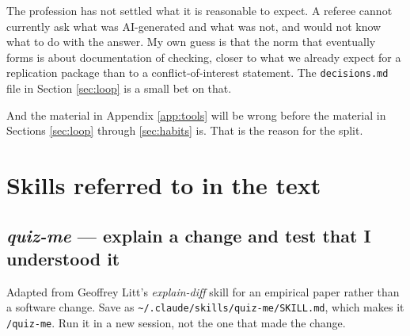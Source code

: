 \documentclass[11pt,a4paper]{article}
\newcommand{\code}[1]{\texttt{\small #1}}
\begin{document}
The profession has not settled what it is reasonable to expect. A referee cannot
currently ask what was AI-generated and what was not, and would not know what to
do with the answer. My own guess is that the norm that eventually forms is
about documentation of checking, closer to what we already expect for a
replication package than to a conflict-of-interest statement. The \code{decisions.md} file in Section \ref{sec:loop} is a small bet
on that.

And the material in Appendix \ref{app:tools} will be wrong before the material in
Sections \ref{sec:loop} through \ref{sec:habits} is. That is the reason for the
split.

\appendix
\clearpage

\section{Skills referred to in the text}
\label{app:skills}

\subsection{\emph{quiz-me} --- explain a change and test that I understood it}

Adapted from Geoffrey Litt's \emph{explain-diff} skill for an empirical paper
rather than a software change. Save as \code{\textasciitilde/.claude/skills/quiz-me/SKILL.md},
which makes it \code{/quiz-me}. Run it in a new session, not the one that made
the change.
\end{document}
